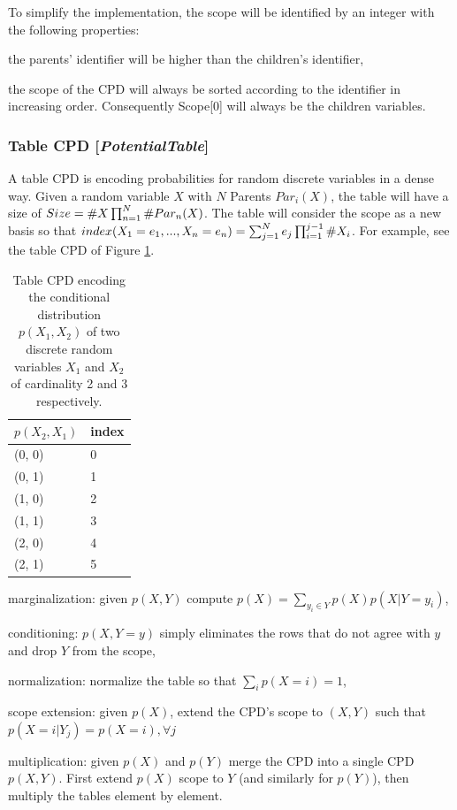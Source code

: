 \documentclass[11pt]{article}
\newcommand{\nllref}[1]{[\small{\textit{#1}}]}
\newcommand{\counta}[1]{\small{\#}#1}
\begin{document}
To simplify the implementation, the scope will be identified by an integer with the following properties:
\begin{compactitem}
\item the parents' identifier will be higher than the children's identifier,
\item the scope of the CPD will always be sorted according to the identifier in increasing order. Consequently Scope[0] will always be the children variables.
\end{compactitem}

\subsubsection{Table CPD \nllref{PotentialTable}}
A table CPD is encoding probabilities for random discrete variables in a dense way. Given a random variable $X$ with $N$ Parents $Par_i(X)$, the table will have a size of $Size=\counta{X}\prod_{n=1}^{N} \counta{Par_n(X)}$. The table will consider the scope as a new basis so that $index(X_1=e_1, ..., X_n=e_n)=\sum_{j=1}^N e_j \prod_{i=1}^{j-1}\counta{X_i} $. For example, see the table CPD of Figure \ref{tablecpd1}.

\begin{table}[h]
\label{tablecpd1}
\centering
\begin{tabular}{| l | l |}
\hline
$p(X_2, X_1)$ & index\\
\hline\hline
(0, 0) & 0\\
\hline
(0, 1) & 1\\
\hline
(1, 0) & 2\\
\hline
(1, 1) & 3\\
\hline
(2, 0) & 4\\
\hline
(2, 1) & 5\\
\hline
\end{tabular}
\caption{Table CPD encoding the conditional distribution $p(X_1,X_2)$ of two discrete random variables $X_1$ and $X_2$ of cardinality 2 and 3 respectively.}
\end{table}


\begin{compactitem}
\item marginalization: given $p(X,Y)$ compute $p(X) = \sum_{y_i \in Y}p(X)p(X|Y=y_i)$,
\item conditioning: $p(X,Y=y)$ simply eliminates the rows that do not agree with $y$ and drop $Y$ from the scope,
\item normalization: normalize the table so that $\sum_ip(X=i)=1$,
\item scope extension: given $p(X)$, extend the CPD's scope to $(X, Y)$ such that $p(X=i|Y_j) = p(X=i), \forall j$
\item multiplication: given $p(X)$ and $p(Y)$ merge the CPD into a single CPD $p(X,Y)$. First extend $p(X)$ scope to $Y$ (and similarly for $p(Y)$), then multiply the tables element by element.
\end{compactitem}
\end{document}
